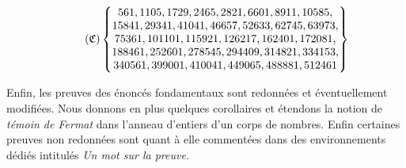 \begin{equation}\tag{$\mathfrak{C}$}\label{liste-carmichael}
	\begin{Bmatrix}
		561,1105,1729,2465,2821,6601,8911,10585, \\
		15841, 29341, 41041, 46657, 52633, 62745, 63973, \\
		75361, 101101, 115921, 126217, 162401, 172081, \\
		188461, 252601, 278545, 294409, 314821, 334153, \\
		340561, 399001, 410041, 449065, 488881, 512461
	\end{Bmatrix}
\end{equation}


\vspace{1em}
Enfin, les preuves des énoncés fondamentaux sont redonnées et éventuellement modifiées. Nous donnons en plus quelques corollaires et étendons la notion de \emph{témoin de Fermat} dans l'anneau d'entiers d'un corps de nombres. Enfin certaines preuves non redonnées sont quant à elle commentées dans des environnements dédiés intitulés \textit{Un mot sur la preuve}.
